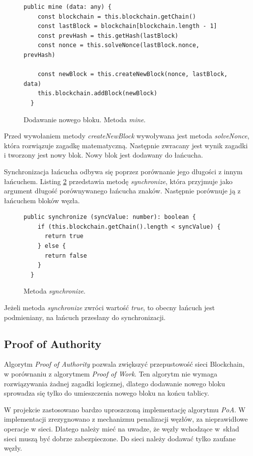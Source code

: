 \documentclass[a4paper,12pt]{book}
\begin{document}
\begin{figure}[H]  
  \centering
\begin{lstlisting}[style=ES6]
  public mine (data: any) {
    const blockchain = this.blockchain.getChain()
    const lastBlock = blockchain[blockchain.length - 1]
    const prevHash = this.getHash(lastBlock)
    const nonce = this.solveNonce(lastBlock.nonce, prevHash)

    const newBlock = this.createNewBlock(nonce, lastBlock, data)
    this.blockchain.addBlock(newBlock)
  }
\end{lstlisting}
\caption{Dodawanie nowego bloku. Metoda \textit{mine}.}
\label{mine}
\end{figure}
Przed wywołaniem metody \textit{createNewBlock} wywoływana jest metoda \textit{solveNonce}, która rozwiązuje zagadkę matematyczną. Następnie zwracany jest wynik zagadki i tworzony jest nowy blok. Nowy blok jest dodawany do łańcucha.

Synchronizacja łańcucha odbywa się poprzez porównanie jego długości z innym łańcuchem. Listing \ref{synchronize} przedstawia metodę \textit{synchronize}, która przyjmuje jako argument długość porównywanego łańcucha znaków. Następnie porównuje ją z łańcuchem bloków węzła.

\begin{figure}[H]  
  \centering
\begin{lstlisting}[style=ES6]
  public synchronize (syncValue: number): boolean {
    if (this.blockchain.getChain().length < syncValue) {
      return true
    } else {
      return false
    }
  }
\end{lstlisting}
\caption{Metoda \textit{synchronize}.}
\label{synchronize}
\end{figure}
Jeżeli metoda \textit{synchronize} zwróci wartość \textit{true}, to obecny łańcuch jest podmieniany, na łańcuch przesłany do synchronizacji.
 
\subsection{Proof of Authority}
Algorytm \textit{Proof of Authority} pozwala zwiększyć przepustowość sieci Blockchain, w porównaniu z algorytmem \textit{Proof of Work}. Ten algorytm nie wymaga rozwiązywania żadnej zagadki logicznej, dlatego dodawanie nowego bloku sprowadza się tylko do umieszczenia nowego bloku na końcu tablicy. 
 
W projekcie zastosowano bardzo uproszczoną implementację algorytmu \textit{PoA}. W implementacji zrezygnowano z mechanizmu penalizacji węzłów, za nieprawidłowe operacje w sieci. Dlatego należy mieć na uwadze, że węzły wchodzące w~skład sieci muszą być dobrze zabezpieczone. Do sieci należy dodawać tylko zaufane węzły.
 
\end{document}

